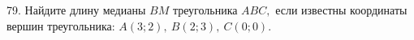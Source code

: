 79. Найдите длину медианы $BM$ треугольника $ABC,$ если известны координаты вершин треугольника: $A(3;2),\ B(2;3),\ C(0;0).$\\
